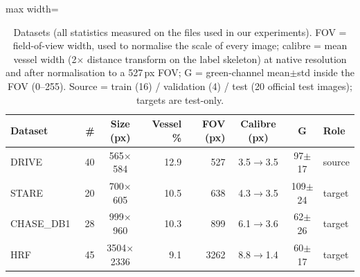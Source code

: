 \begin{table}[t]
\centering
\caption{Datasets (all statistics measured on the files used in our experiments). FOV = field-of-view width, used to normalise the scale of every image; calibre = mean vessel width (2$\times$ distance transform on the label skeleton) at native resolution and after normalisation to a 527\,px FOV; G = green-channel mean$\pm$std inside the FOV (0--255). Source = train (16) / validation (4) / test (20 official test images); targets are test-only.}
\label{tab:data}
\small
\begin{adjustbox}{max width=\columnwidth}\begin{tabular}{l r c r r c c l}
\toprule
Dataset & \# & Size (px) & Vessel \% & FOV (px) & Calibre (px) & G & Role \\
\midrule
DRIVE~\cite{staal2004} & 40 & 565$\times$584 & 12.9 & 527 & 3.5$\to$3.5 & 97$\pm$17 & source \\
STARE~\cite{hoover2000} & 20 & 700$\times$605 & 10.5 & 638 & 4.3$\to$3.5 & 109$\pm$24 & target \\
CHASE\_DB1~\cite{fraz2012} & 28 & 999$\times$960 & 10.3 & 899 & 6.1$\to$3.6 & 62$\pm$26 & target \\
HRF~\cite{budai2013} & 45 & 3504$\times$2336 & 9.1 & 3262 & 8.8$\to$1.4 & 60$\pm$17 & target \\
\bottomrule
\end{tabular}\end{adjustbox}
\end{table}